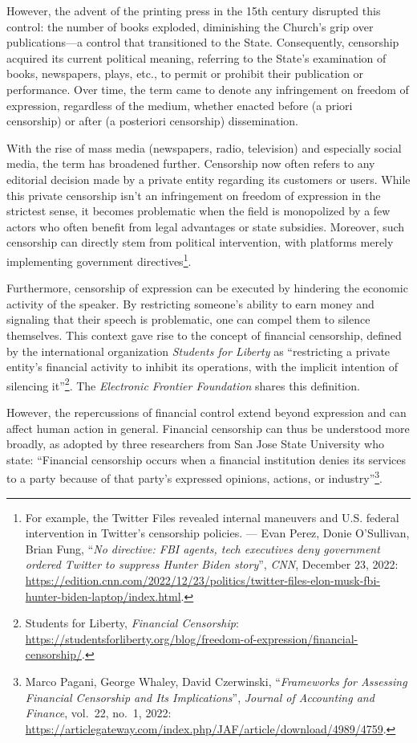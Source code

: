 \documentclass[
  a5paper,
  smalldemyvopaper,10pt,twoside,onecolumn,openright,extrafontsizes,hidelinks]{memoir}
\begin{document}
However, the advent of the printing press in the 15th century disrupted
this control: the number of books exploded, diminishing the Church's
grip over publications---a control that transitioned to the State.
Consequently, censorship acquired its current political meaning,
referring to the State's examination of books, newspapers, plays, etc.,
to permit or prohibit their publication or performance. Over time, the
term came to denote any infringement on freedom of expression,
regardless of the medium, whether enacted before (a priori censorship)
or after (a posteriori censorship) dissemination.

With the rise of mass media (newspapers, radio, television) and
especially social media, the term has broadened further. Censorship now
often refers to any editorial decision made by a private entity
regarding its customers or users. While this private censorship isn't an
infringement on freedom of expression in the strictest sense, it becomes
problematic when the field is monopolized by a few actors who often
benefit from legal advantages or state subsidies. Moreover, such
censorship can directly stem from political intervention, with platforms
merely implementing government directives\footnote{For example, the
  Twitter Files revealed internal maneuvers and U.S. federal
  intervention in Twitter's censorship policies. --- Evan Perez, Donie
  O'Sullivan, Brian Fung, ``\emph{No directive: FBI agents, tech
  executives deny government ordered Twitter to suppress Hunter Biden
  story}'', \emph{CNN}, December 23, 2022:
  \url{https://edition.cnn.com/2022/12/23/politics/twitter-files-elon-musk-fbi-hunter-biden-laptop/index.html}.}.

Furthermore, censorship of expression can be executed by hindering the
economic activity of the speaker. By restricting someone's ability to
earn money and signaling that their speech is problematic, one can
compel them to silence themselves. This context gave rise to the concept
of financial censorship, defined by the international organization
\emph{Students for Liberty} as ``restricting a private entity's
financial activity to inhibit its operations, with the implicit
intention of silencing it''\footnote{Students for Liberty,
  \emph{Financial Censorship}:
  \url{https://studentsforliberty.org/blog/freedom-of-expression/financial-censorship/}.}.
The \emph{Electronic Frontier Foundation} shares this definition.

However, the repercussions of financial control extend beyond expression
and can affect human action in general. Financial censorship can thus be
understood more broadly, as adopted by three researchers from San Jose
State University who state: ``Financial censorship occurs when a
financial institution denies its services to a party because of that
party's expressed opinions, actions, or industry''\footnote{Marco
  Pagani, George Whaley, David Czerwinski, ``\emph{Frameworks for
  Assessing Financial Censorship and Its Implications}'', \emph{Journal
  of Accounting and Finance}, vol.~22, no.~1, 2022:
  \url{https://articlegateway.com/index.php/JAF/article/download/4989/4759}.}.
\end{document}
